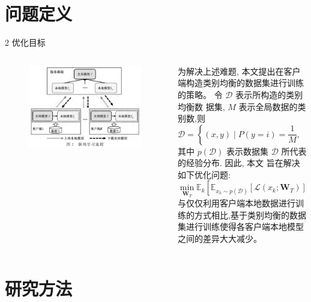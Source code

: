 \documentclass{sintefbeamer}
\theoremstyle{definition}
\begin{document}
\section{问题定义}

\begin{frame}{2 优化目标}

\begin{columns}
\begin{column}{0.4\textwidth}
\begin{figure}[ht]
\centering
\includegraphics[width=1\textwidth]{images/img_fl}
\end{figure}
\end{column}
\begin{column}{0.6\textwidth}
为解决上述难题, 本文提出在客户端构造类别均衡的数据集进行训练的策略。 令 $\mathcal{D}$ 表示所构造的类别 均衡数 据集, $M$ 表示全局数据的类别数,则 
$$
\mathcal{D}=\left\{(x, y) \mid P(y=i)=\frac{1}{M}, \quad i \in\{0,1, \ldots, M-1\}\right\}
$$
其中 $p(\mathcal{D})$ 表示数据集 $\mathcal{D}$ 所代表的经验分布. 因此, 本文 旨在解决如下优化问题:
$$
\min _{\boldsymbol{W}_T} \mathbb{E}_k\left[\mathbb{E}_{x_k \sim p(\mathcal{D})}\left[\mathcal{L}\left(x_k ; \boldsymbol{W}_T\right)\right]\right]
$$
与仅仅利用客户端本地数据进行训练的方式相比,基于类别均衡的数据集进行训练使得各客户端本地模型之间的差异大大减少。
\end{column}
\end{columns}


\end{frame}

\section{研究方法}
\end{document}
